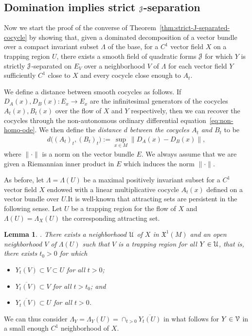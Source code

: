 \documentclass[12pt,reqno]{amsart}
\numberwithin{equation}{section}
\theoremstyle{plain}
\newtheorem{lemma}[theorem]{Lemma}
\theoremstyle{definition}
\newcommand{\V}{\EuScript{V}}
\newcommand{\U}{\EuScript{U}}
\newcommand{\J}{\EuScript{J}}
\newcommand{\Mundo}{\mathfrak{X}^{1}(M)}
\begin{document}
\subsection{Domination implies strict $\J$-separation}
\label{sec:partial-hyperb-impli}

Now we start the proof of the converse of
Theorem~\ref{thm:strict-J-separated-cocycle} by showing
that, given a dominated decomposition of a vector bundle
over a compact invariant subset $\Lambda$ of the base, for a
$C^1$ vector field $X$ on a trapping region $U$, there
exists a smooth field of quadratic forms $\J$ for which $Y$
is strictly $\J$-separated on $E_V$ over a neighborhood $V$
of $\Lambda$ for each vector field $Y$ sufficiently $C^1$
close to $X$ and every cocycle close enough to $A_t$.

We define a distance between smooth cocycles as follows. If
$D_A(x), D_B(x):E_x\to E_x$ are the infinitesimal generators
of the cocycles $A_t(x),B_t(x)$ over the flow of $X$ and $Y$
respectively, then we can recover the cocycles through the
non-autonomous ordinary differential
equation~\eqref{eq:non-homo-ode}. We then define the
\emph{distance $d$ between the cocycles $A_t$ and $B_t$} to
be
\begin{align*}
  d\big((A_t)_t,(B_t)_t\big):=\sup_{x\in M}\|D_A(x)-D_B(x)\|,
\end{align*}
where $\|\cdot\|$ is a norm on the vector bundle $E$. We
always assume that we are given a Riemannian inner product
in $E$ which induces the norm $\|\cdot\|$.

As before, let $\Lambda=\Lambda(U)$ be a maximal positively
invariant subset for a $C^1$ vector field $X$ endowed with a
linear multiplicative cocycle $A_t(x)$ defined on a vector
bundle over $U$.It is well-known that attracting sets are persistent in the
following sense.  Let $U$ be a trapping region for the flow
of $X$ and $\Lambda(U)=\Lambda_X(U)$ the corresponding
attracting set.
\begin{lemma}\cite[Chapter 10]{robinson1999}.
  \label{le:trapping}
   There exists a neighborhood $\U$ of $X$ in
  $\Mundo$ and an open neighborhood $V$ of $\Lambda(U)$
  such that $V$ is a trapping region for all $Y\in\U$, that
  is, there exists $t_0>0$ for which
  \begin{itemize}
  \item $Y_t(V)\subset V\subset U$ for all $t>0$;
  \item $\overline{Y_t(V)}\subset V$ for all $t>t_0$; and
  \item $\overline{Y_t(V)}\subset U$ for all $t>0$.
  \end{itemize}
\end{lemma}
We can thus consider
$\Lambda_Y=\Lambda_Y(U)=\cap_{t>0}\overline{Y_t(U)}$ in what follows
for $Y\in\V$ in a small enough $C^1$ neighborhood of $X$.
\end{document}

